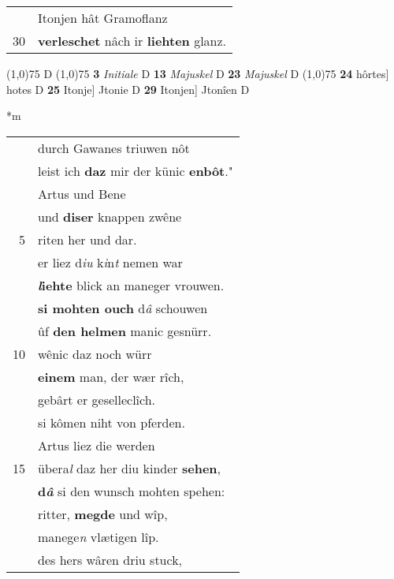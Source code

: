 \documentclass[8pt,a4paper,notitlepage]{article}
\begin{document}
\begin{table}[ht]
\begin{minipage}[t]{0.5\linewidth}
\begin{tabular}{rl}
 & Itonjen hât Gramoflanz\\ 
30 & \textbf{verleschet} nâch ir \textbf{liehten} glanz.\\ 
\end{tabular}
\scriptsize
\line(1,0){75} \newline
D \newline
\line(1,0){75} \newline
\textbf{3} \textit{Initiale} D  \textbf{13} \textit{Majuskel} D  \textbf{23} \textit{Majuskel} D  \newline
\line(1,0){75} \newline
\textbf{24} hôrtes] hotes D \textbf{25} Itonje] Jtonie D \textbf{29} Itonjen] Jtonîen D \newline
\end{minipage}
\hspace{0.5cm}
\begin{minipage}[t]{0.5\linewidth}
\small
\begin{center}*m
\end{center}
\begin{tabular}{rl}
 & durch Gawanes triuwen nôt\\ 
 & leist ich \textbf{daz} mir der künic \textbf{enbôt}."\\ 
 & Artus und Bene\\ 
 & und \textbf{diser} knappen zwêne\\ 
5 & riten her und dar.\\ 
 & er liez d\textit{iu} k\textit{i}n\textit{t} nemen war\\ 
 & \textbf{\textit{l}iehte} blick an maneger vrouwen.\\ 
 & \textbf{si mohten ouch} d\textit{â} schouwen\\ 
 & ûf \textbf{den helmen} manic gesnürr.\\ 
10 & wênic daz noch würr\\ 
 & \textbf{einem} man, der wær rîch,\\ 
 & gebârt er geselleclîch.\\ 
 & si kômen niht von pferden.\\ 
 & Artus liez die werden\\ 
15 & übera\textit{l} daz her diu kinder \textbf{sehen},\\ 
 & \textbf{d\textit{â}} si den wunsch mohten spehen:\\ 
 & ritter, \textbf{megde} und wîp,\\ 
 & manege\textit{n} vlætigen lîp.\\ 
 & des hers wâren driu stuck,\\ 

\end{tabular}
\end{minipage}
\end{table}
\end{document}
